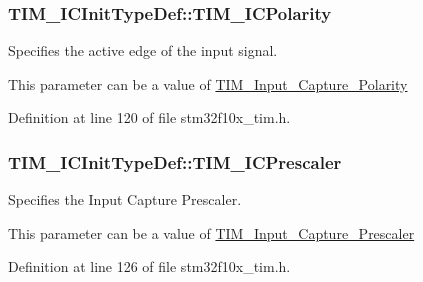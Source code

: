 \hypertarget{struct_t_i_m___i_c_init_type_def_a234c284efc36c0cc15a2ed0fb4435557}{
\subsubsection[{T\-I\-M\-\_\-\-I\-C\-Polarity}]{ T\-I\-M\-\_\-\-I\-C\-Init\-Type\-Def\-::\-T\-I\-M\-\_\-\-I\-C\-Polarity}}\label{struct_t_i_m___i_c_init_type_def_a234c284efc36c0cc15a2ed0fb4435557}
\begin{DoxyVerb}   Specifies the active edge of the input signal.
\end{DoxyVerb}
 This parameter can be a value of \hyperlink{group___t_i_m___input___capture___polarity}{T\-I\-M\-\_\-\-Input\-\_\-\-Capture\-\_\-\-Polarity} 

Definition at line 120 of file stm32f10x\-\_\-tim.\-h.

\hypertarget{struct_t_i_m___i_c_init_type_def_ac61c7fc999ace295ac81b304cabd61e0}{
\subsubsection[{T\-I\-M\-\_\-\-I\-C\-Prescaler}]{ T\-I\-M\-\_\-\-I\-C\-Init\-Type\-Def\-::\-T\-I\-M\-\_\-\-I\-C\-Prescaler}}\label{struct_t_i_m___i_c_init_type_def_ac61c7fc999ace295ac81b304cabd61e0}
\begin{DoxyVerb}  Specifies the Input Capture Prescaler.
\end{DoxyVerb}
 This parameter can be a value of \hyperlink{group___t_i_m___input___capture___prescaler}{T\-I\-M\-\_\-\-Input\-\_\-\-Capture\-\_\-\-Prescaler} 

Definition at line 126 of file stm32f10x\-\_\-tim.\-h.

